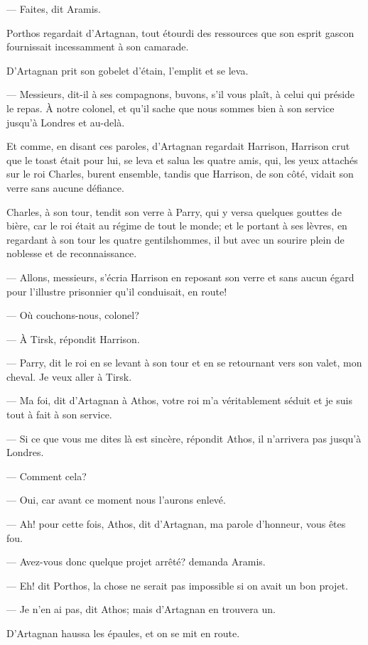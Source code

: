 — Faites, dit Aramis.

Porthos regardait d'Artagnan, tout étourdi des ressources que son esprit gascon fournissait incessamment à son camarade.

D'Artagnan prit son gobelet d'étain, l'emplit et se leva.

— Messieurs, dit-il à ses compagnons, buvons, s'il vous plaît, à celui qui préside le repas. À notre colonel, et qu'il sache que nous sommes bien à son service jusqu'à Londres et au-delà.

Et comme, en disant ces paroles, d'Artagnan regardait Harrison, Harrison crut que le toast était pour lui, se leva et salua les quatre amis, qui, les yeux attachés sur le roi Charles, burent ensemble, tandis que Harrison, de son côté, vidait son verre sans aucune défiance.

Charles, à son tour, tendit son verre à Parry, qui y versa quelques gouttes de bière, car le roi était au régime de tout le monde; et le portant à ses lèvres, en regardant à son tour les quatre gentilshommes, il but avec un sourire plein de noblesse et de reconnaissance.

— Allons, messieurs, s'écria Harrison en reposant son verre et sans aucun égard pour l'illustre prisonnier qu'il conduisait, en route!

— Où couchons-nous, colonel?

— À Tirsk, répondit Harrison.

— Parry, dit le roi en se levant à son tour et en se retournant vers son valet, mon cheval. Je veux aller à Tirsk.

— Ma foi, dit d'Artagnan à Athos, votre roi m'a véritablement séduit et je suis tout à fait à son service.

— Si ce que vous me dites là est sincère, répondit Athos, il n'arrivera pas jusqu'à Londres.

— Comment cela?

— Oui, car avant ce moment nous l'aurons enlevé.

— Ah! pour cette fois, Athos, dit d'Artagnan, ma parole d'honneur, vous êtes fou.

— Avez-vous donc quelque projet arrêté? demanda Aramis.

— Eh! dit Porthos, la chose ne serait pas impossible si on avait un bon projet.

— Je n'en ai pas, dit Athos; mais d'Artagnan en trouvera un.

D'Artagnan haussa les épaules, et on se mit en route.